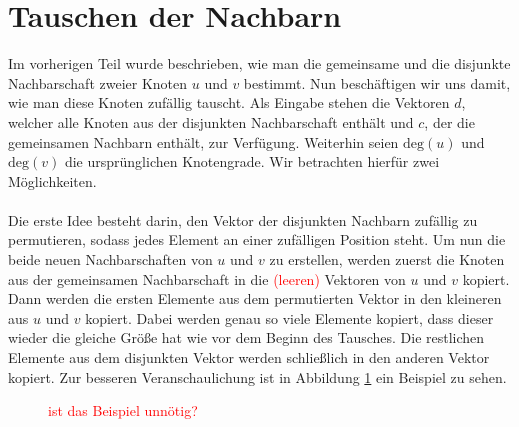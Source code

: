
\section{Tauschen der Nachbarn}
Im vorherigen Teil wurde beschrieben, wie man die gemeinsame und die disjunkte Nachbarschaft zweier Knoten
$u$ und $v$ bestimmt. Nun beschäftigen wir uns damit, wie man diese Knoten zufällig tauscht. Als Eingabe 
stehen die Vektoren $d$, welcher alle Knoten aus der disjunkten Nachbarschaft enthält
und $c$, der die gemeinsamen Nachbarn enthält, zur Verfügung. Weiterhin seien $\text{deg}(u)$ und
 $\text{deg}(v)$ die ursprünglichen Knotengrade. 
Wir betrachten hierfür zwei Möglichkeiten.
\\
\\
Die erste Idee besteht darin,  
den Vektor der disjunkten Nachbarn zufällig zu permutieren, sodass jedes Element an 
einer zufälligen Position steht. Um nun die beide \glqq neuen\grqq{} Nachbarschaften von $u$ und $v$ zu erstellen,
werden zuerst die Knoten aus der gemeinsamen Nachbarschaft in die \textcolor{red}{(leeren)} Vektoren von $u$ und $v$ kopiert.
Dann werden die ersten Elemente aus dem permutierten Vektor in den kleineren aus $u$ und $v$ kopiert.
Dabei werden genau so viele Elemente kopiert, dass dieser wieder die gleiche Größe hat wie vor dem Beginn
des Tausches. Die restlichen Elemente aus dem disjunkten Vektor werden schließlich in den anderen Vektor kopiert.
Zur besseren Veranschaulichung ist in Abbildung \ref{fig:trade_shuffle} ein Beispiel zu sehen.
\begin{figure}[h]
\centering
  \caption{\textcolor{red}{ist das Beispiel unnötig?}}
  \label{fig:trade_shuffle}
\end{figure}
